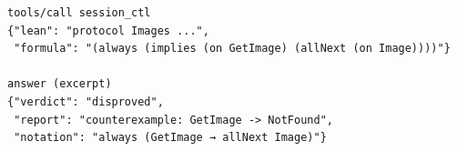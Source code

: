 \begin{lstlisting}[language={},basicstyle=\ttfamily\footnotesize,breaklines=true]
tools/call session_ctl
{"lean": "protocol Images ...",
 "formula": "(always (implies (on GetImage) (allNext (on Image))))"}

answer (excerpt)
{"verdict": "disproved",
 "report": "counterexample: GetImage -> NotFound",
 "notation": "always (GetImage → allNext Image)"}
\end{lstlisting}

